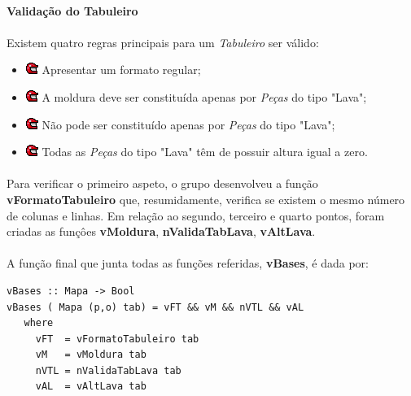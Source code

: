\documentclass[12pt,a4paper]{report}
\begin{document}
\paragraph{}\textbf{Validação do Tabuleiro}
\paragraph{}Existem quatro regras principais para um \textit{Tabuleiro} ser válido:

\begin{itemize}
\item[]\includegraphics[scale=0.7]{p4.png} Apresentar um formato regular;
\item[]\includegraphics[scale=0.7]{p4.png} A moldura deve ser constituída apenas por \textit{Peças} do tipo "Lava";
\item[]\includegraphics[scale=0.7]{p4.png} Não pode ser constituído apenas por \textit{Peças} do tipo "Lava";
\item[]\includegraphics[scale=0.7]{p4.png} Todas as \textit{Peças} do tipo "Lava" têm de possuir altura igual a zero.
\end{itemize}

\paragraph{} Para verificar o primeiro aspeto, o grupo desenvolveu a função \textbf{vFormatoTabuleiro} que, resumidamente, verifica se existem o mesmo número de colunas e linhas.
\newline Em relação ao segundo, terceiro e quarto pontos, foram criadas as funçôes \textbf{vMoldura}, \textbf{nValidaTabLava}, \textbf{vAltLava}.

\paragraph{} A função final que junta todas as funções referidas, \textbf{vBases}, é dada por:
 \begin{verbatim}
vBases :: Mapa -> Bool                                            
vBases ( Mapa (p,o) tab) = vFT && vM && nVTL && vAL
   where
     vFT  = vFormatoTabuleiro tab
     vM   = vMoldura tab
     nVTL = nValidaTabLava tab
     vAL  = vAltLava tab
 \end{verbatim}
\end{document}
